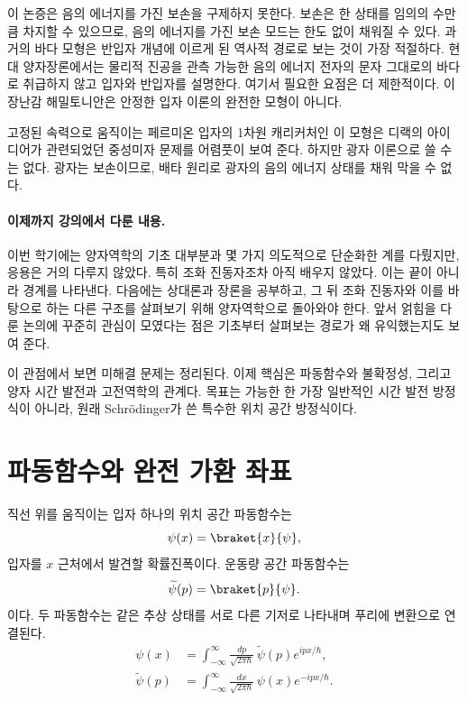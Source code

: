 이 논증은 음의 에너지를 가진 보손을 구제하지 못한다. 보손은 한 상태를 임의의 수만큼 차지할 수 있으므로, 음의 에너지를 가진 보손 모드는 한도 없이 채워질 수 있다. 과거의 바다 모형은 반입자 개념에 이르게 된 역사적 경로로 보는 것이 가장 적절하다. 현대 양자장론에서는 물리적 진공을 관측 가능한 음의 에너지 전자의 문자 그대로의 바다로 취급하지 않고 입자와 반입자를 설명한다. 여기서 필요한 요점은 더 제한적이다. 이 장난감 해밀토니안은 안정한 입자 이론의 완전한 모형이 아니다.

고정된 속력으로 움직이는 페르미온 입자의 1차원 캐리커처인 이 모형은 디랙의 아이디어가 관련되었던 중성미자 문제를 어렴풋이 보여 준다. 하지만 광자 이론으로 쓸 수는 없다. 광자는 보손이므로, 배타 원리로 광자의 음의 에너지 상태를 채워 막을 수 없다.

\begin{classroomqa}
\end{classroomqa}

\paragraph{이제까지 강의에서 다룬 내용.}
이번 학기에는 양자역학의 기초 대부분과 몇 가지 의도적으로 단순화한 계를 다뤘지만, 응용은 거의 다루지 않았다. 특히 조화 진동자조차 아직 배우지 않았다. 이는 끝이 아니라 경계를 나타낸다. 다음에는 상대론과 장론을 공부하고, 그 뒤 조화 진동자와 이를 바탕으로 하는 다른 구조를 살펴보기 위해 양자역학으로 돌아와야 한다. 앞서 얽힘을 다룬 논의에 꾸준히 관심이 모였다는 점은 기초부터 살펴보는 경로가 왜 유익했는지도 보여 준다.

이 관점에서 보면 미해결 문제는 정리된다. 이제 핵심은 파동함수와 불확정성, 그리고 양자 시간 발전과 고전역학의 관계다. 목표는 가능한 한 가장 일반적인 시간 발전 방정식이 아니라, 원래 Schr\"odinger가 쓴 특수한 위치 공간 방정식이다.

\section{파동함수와 완전 가환 좌표}

직선 위를 움직이는 입자 하나의 위치 공간 파동함수는
\begin{equation}
\psi(x)=\braket{x}{\psi},
\end{equation}
입자를 \(x\) 근처에서 발견할 확률진폭이다. 운동량 공간 파동함수는
\begin{equation}
\widetilde{\psi}(p)=\braket{p}{\psi}.
\end{equation}
이다. 두 파동함수는 같은 추상 상태를 서로 다른 기저로 나타내며 푸리에 변환으로 연결된다.
\begin{align}
\psi(x)
&=
\int_{-\infty}^{\infty}
\frac{dp}{\sqrt{2\pi\hbar}}\,
\widetilde{\psi}(p)e^{ipx/\hbar},
\label{eq:l10-fourier-forward}\\
\widetilde{\psi}(p)
&=
\int_{-\infty}^{\infty}
\frac{dx}{\sqrt{2\pi\hbar}}\,
\psi(x)e^{-ipx/\hbar}.
\label{eq:l10-fourier-inverse}
\end{align}

